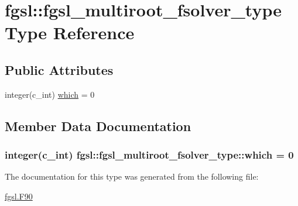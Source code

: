 \hypertarget{structfgsl_1_1fgsl__multiroot__fsolver__type}{\section{fgsl\-:\-:fgsl\-\_\-multiroot\-\_\-fsolver\-\_\-type Type Reference}
\label{structfgsl_1_1fgsl__multiroot__fsolver__type}
}
\subsection*{Public Attributes}
\begin{DoxyCompactItemize}
\item 
integer(c\-\_\-int) \hyperlink{structfgsl_1_1fgsl__multiroot__fsolver__type_a556e9bd612764e527f926ac1342a7016}{which} = 0
\end{DoxyCompactItemize}


\subsection{Member Data Documentation}
\hypertarget{structfgsl_1_1fgsl__multiroot__fsolver__type_a556e9bd612764e527f926ac1342a7016}{
\subsubsection[{which}]{\setlength{\rightskip}{0pt plus 5cm}integer(c\-\_\-int) fgsl\-::fgsl\-\_\-multiroot\-\_\-fsolver\-\_\-type\-::which = 0}}\label{structfgsl_1_1fgsl__multiroot__fsolver__type_a556e9bd612764e527f926ac1342a7016}


The documentation for this type was generated from the following file\-:\begin{DoxyCompactItemize}
\item 
\hyperlink{fgsl_8F90}{fgsl.\-F90}\end{DoxyCompactItemize}
